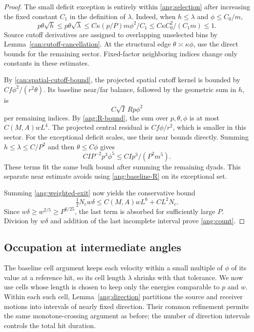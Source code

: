 \begin{proof}
The small deficit exception is entirely within
\eqref{ang:selection} after increasing the fixed constant $C_1$ in the
definition of $\lambda$. Indeed, when $h\le\lambda$ and
$\phi\le C_0/m$,
\[
 p\theta\sqrt h\le p\theta\sqrt\lambda
 \le C\kappa(p/P)m\phi^2/C_1
 \le C\kappa C_0^2/(C_1m)\le1.
\]
Source cutoff derivatives are assigned to overlapping unselected bins
by Lemma~\ref{can:cutoff-cancellation}. At the structural edge
$\theta\asymp\kappa\phi$, use the direct bounds for the remaining sector.
Fixed-factor neighboring indices change only constants in these
estimates.

By \eqref{can:spatial-cutoff-bound}, the projected spatial cutoff kernel is bounded by
$Cf\phi^2/(r^2\theta)$. Its baseline near/far balance, followed by the
geometric sum in $h$, is
\[
 C\sqrt I\,Rp\phi^2
\]
per remaining indices. By \eqref{ang:R-bound}, the sum over $p,\theta,
\phi$ is at most $C(M,A)wL^4$. The projected central residual is
$Cf\phi/r^2$, which is smaller in this sector. For the exceptional
deficit scales, use their near bounds directly. Summing
$h\le\lambda\le C/P^2$ and then $\theta\le C\phi$ gives
\[
 CI P^{-2}p^3\phi^5\le CI p^3/(P^2m^5).
\]
These terms fit the same bulk bound after summing the remaining dyads.
This separate near estimate avoids using \eqref{ang:baseline-R} on its
exceptional set.

Summing \eqref{ang:weighted-exit} now yields the conservative bound
\[
 \tfrac12N_cw\delta
 \le C(M,A)wL^6+CL^2N_c.
\]
Since $w\delta\ge w^{2/5}\ge P^{6/25}$, the last term is absorbed
for sufficiently large $P$. Division by $w\delta$ and addition of
the last incomplete interval prove \eqref{ang:count}.
\end{proof}

\subsection{Occupation at intermediate angles}

The baseline cell argument keeps each velocity within a small multiple
of $\phi$ of its value at a reference hit, so its cell length $\lambda$
shrinks with that tolerance. We now use cells whose length is chosen to
keep only the energies comparable to $p$ and $w$. Within each such cell,
Lemma~\ref{ang:direction} partitions the source and receiver motions into
intervals of nearly fixed direction. Their common refinement permits
the same monotone-crossing argument as before; the number of direction
intervals controls the total hit duration.

